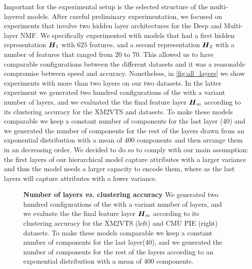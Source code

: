 \documentclass[10pt,journal,compsoc]{IEEEtran}
\begin{document}
Important for the experimental setup is the selected structure of the multi-layered models. After careful preliminary experimentation, we focused on experiments that involve two hidden layer architectures for the Deep \seminmf and Multi-layer NMF. We specifically experimented with models that had a first hidden representation $\boldsymbol H_1$ with $625$ features, and a second representation $\boldsymbol H_2$ with a number of features that ranged from $20$ to $70$. This allowed us to have comparable configurations between the different datasets and it was a reasonable compromise between speed and accuracy. Nonetheless, in \autoref{fig:all_layers} we show experiments with more than two layers on our two datasets. In the latter experiment we generated two hundred configurations of the \deepseminmf with a variant number of layers, and we evaluated the the final feature layer $\boldsymbol{H}_m$ according to its clustering accuracy for the XM2VTS and \cmupie datasets. To make these models comparable we keep a constant number of components for the last layer ($40$) and we generated the number of components for the rest of the layers drawn from an exponential distribution with a mean of 400 components and then arrange them in an decreasing order. We decided to do so to comply with our main assumption: the first layers of our hierarchical model capture attributes with a larger variance and thus the model needs a larger capacity to encode them, where as the last layers will capture attributes with a lower variance. 

\begin{figure}[hpt]
\centering
{}
\caption{{\bfseries Number of layers \emph{vs.} clustering accuracy}
We generated two hundred configurations of the \deepseminmf with a variant number of layers, and we evaluate the the final feature layer $\boldsymbol{H}_m$ according to its clustering accuracy for the XM2VTS (left) and CMU PIE (right) datasets. To make these models comparable we keep a constant number of components for the last layer($40$), and we generated the number of components for the rest of the layers according to an exponential distribution with a mean of 400 components.}
\label{fig:all_layers}
\end{figure}
\end{document}
